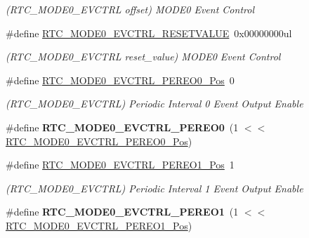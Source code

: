 \begin{DoxyCompactItemize}
\begin{DoxyCompactList}\small\item\em (R\+T\+C\+\_\+\+M\+O\+D\+E0\+\_\+\+E\+V\+C\+T\+R\+L offset) M\+O\+D\+E0 Event Control \end{DoxyCompactList}\item 
\hypertarget{group___s_a_m_l21___r_t_c_ga365ba0eacb4a59d8a35ca9d4284cdc15}{}\#define \hyperlink{group___s_a_m_l21___r_t_c_ga365ba0eacb4a59d8a35ca9d4284cdc15}{R\+T\+C\+\_\+\+M\+O\+D\+E0\+\_\+\+E\+V\+C\+T\+R\+L\+\_\+\+R\+E\+S\+E\+T\+V\+A\+L\+U\+E}~0x00000000ul\label{group___s_a_m_l21___r_t_c_ga365ba0eacb4a59d8a35ca9d4284cdc15}

\begin{DoxyCompactList}\small\item\em (R\+T\+C\+\_\+\+M\+O\+D\+E0\+\_\+\+E\+V\+C\+T\+R\+L reset\+\_\+value) M\+O\+D\+E0 Event Control \end{DoxyCompactList}\item 
\hypertarget{group___s_a_m_l21___r_t_c_ga40b675791776305263fc775c2dfd01e4}{}\#define \hyperlink{group___s_a_m_l21___r_t_c_ga40b675791776305263fc775c2dfd01e4}{R\+T\+C\+\_\+\+M\+O\+D\+E0\+\_\+\+E\+V\+C\+T\+R\+L\+\_\+\+P\+E\+R\+E\+O0\+\_\+\+Pos}~0\label{group___s_a_m_l21___r_t_c_ga40b675791776305263fc775c2dfd01e4}

\begin{DoxyCompactList}\small\item\em (R\+T\+C\+\_\+\+M\+O\+D\+E0\+\_\+\+E\+V\+C\+T\+R\+L) Periodic Interval 0 Event Output Enable \end{DoxyCompactList}\item 
\hypertarget{group___s_a_m_l21___r_t_c_ga298a455677d01b91116a17850c27bc66}{}\#define {\bfseries R\+T\+C\+\_\+\+M\+O\+D\+E0\+\_\+\+E\+V\+C\+T\+R\+L\+\_\+\+P\+E\+R\+E\+O0}~(1 $<$$<$ \hyperlink{group___s_a_m_l21___r_t_c_ga40b675791776305263fc775c2dfd01e4}{R\+T\+C\+\_\+\+M\+O\+D\+E0\+\_\+\+E\+V\+C\+T\+R\+L\+\_\+\+P\+E\+R\+E\+O0\+\_\+\+Pos})\label{group___s_a_m_l21___r_t_c_ga298a455677d01b91116a17850c27bc66}

\item 
\hypertarget{group___s_a_m_l21___r_t_c_ga6928127965c504ba25cf31a3e112c95f}{}\#define \hyperlink{group___s_a_m_l21___r_t_c_ga6928127965c504ba25cf31a3e112c95f}{R\+T\+C\+\_\+\+M\+O\+D\+E0\+\_\+\+E\+V\+C\+T\+R\+L\+\_\+\+P\+E\+R\+E\+O1\+\_\+\+Pos}~1\label{group___s_a_m_l21___r_t_c_ga6928127965c504ba25cf31a3e112c95f}

\begin{DoxyCompactList}\small\item\em (R\+T\+C\+\_\+\+M\+O\+D\+E0\+\_\+\+E\+V\+C\+T\+R\+L) Periodic Interval 1 Event Output Enable \end{DoxyCompactList}\item 
\hypertarget{group___s_a_m_l21___r_t_c_ga579adf5b3d5c56478a8a45ec96b7f13a}{}\#define {\bfseries R\+T\+C\+\_\+\+M\+O\+D\+E0\+\_\+\+E\+V\+C\+T\+R\+L\+\_\+\+P\+E\+R\+E\+O1}~(1 $<$$<$ \hyperlink{group___s_a_m_l21___r_t_c_ga6928127965c504ba25cf31a3e112c95f}{R\+T\+C\+\_\+\+M\+O\+D\+E0\+\_\+\+E\+V\+C\+T\+R\+L\+\_\+\+P\+E\+R\+E\+O1\+\_\+\+Pos})\label{group___s_a_m_l21___r_t_c_ga579adf5b3d5c56478a8a45ec96b7f13a}


\end{DoxyCompactItemize}
